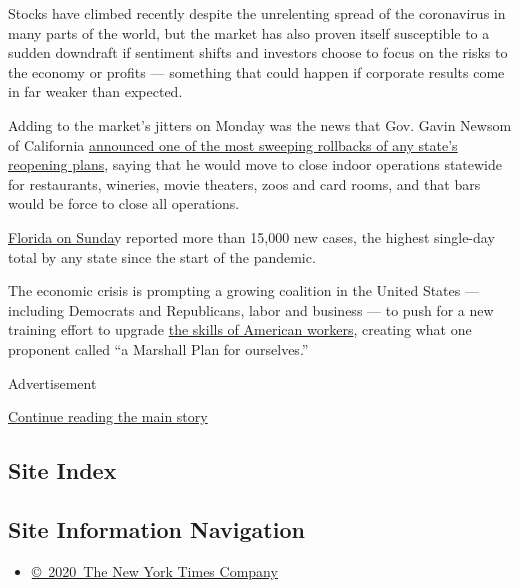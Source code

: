 Stocks have climbed recently despite the unrelenting spread of the
coronavirus in many parts of the world, but the market has also proven
itself susceptible to a sudden downdraft if sentiment shifts and
investors choose to focus on the risks to the economy or profits ---
something that could happen if corporate results come in far weaker than
expected.

Adding to the market's jitters on Monday was the news that Gov. Gavin
Newsom of California
\href{https://twitter.com/GavinNewsom/status/1282752861835649024?s=20}{announced
one of the most sweeping rollbacks of any state's reopening plans},
saying that he would move to close indoor operations statewide for
restaurants, wineries, movie theaters, zoos and card rooms, and that
bars would be force to close all operations.

\href{https://www.nytimes.com/2020/07/12/us/florida-coronavirus-covid-cases.html}{Florida
on Sunda}y reported more than 15,000 new cases, the highest single-day
total by any state since the start of the pandemic.

The economic crisis is prompting a growing coalition in the United
States --- including Democrats and Republicans, labor and business ---
to push for a new training effort to upgrade
\href{https://www.nytimes.com/2020/07/13/business/coronavirus-retraining-workers.html}{the
skills of American workers}, creating what one proponent called ``a
Marshall Plan for ourselves.''

Advertisement

\protect\hyperlink{after-bottom}{Continue reading the main story}

\hypertarget{site-index}{%
\subsection{Site Index}\label{site-index}}

\hypertarget{site-information-navigation}{%
\subsection{Site Information
Navigation}\label{site-information-navigation}}

\begin{itemize}
\tightlist
\item
  \href{https://help.nytimes.com/hc/en-us/articles/115014792127-Copyright-notice}{©~2020~The
  New York Times Company}
\end{itemize}

